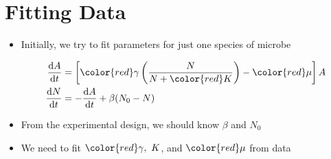 \documentclass[]{article}
\newcommand*\diff{\mathop{}\!\mathrm{d}}
\newcommand*\red{\color{red}}
\begin{document}
\section{Fitting Data}\label{fitting-data}

\begin{itemize}
\itemsep1pt\parskip0pt
\item
  Initially, we try to fit parameters for just one species of microbe

  \begin{align*}
  \frac{\diff A}{\diff t} &= \left[ {\red \gamma} \left( \frac{N}{N +
  {\color{red} K}}\right) - {\red \mu} \right]A \\
  \frac{\diff N}{\diff t} &= - \frac{\diff A}{\diff t} + 
  \beta(N_0 - N)
  \end{align*}
\item
  From the experimental design, we should know \(\beta\) and \(N_0\)
\item
  We need to fit \({\red \gamma, \ K}\), and \({\red \mu}\) from data
\end{itemize}
\end{document}
